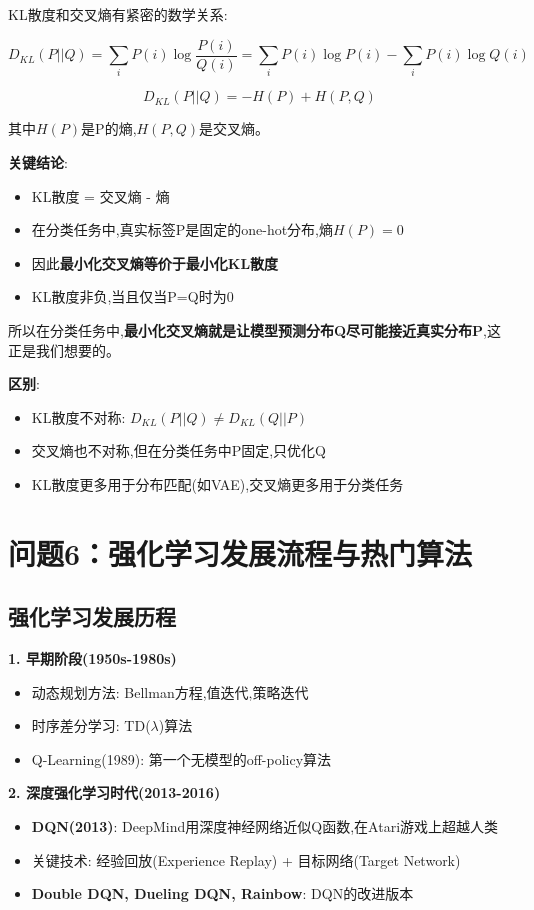 \documentclass[UTF8]{ctexart}
\begin{document}
KL散度和交叉熵有紧密的数学关系:

$$D_{KL}(P||Q) = \sum_{i}P(i)\log\frac{P(i)}{Q(i)} = \sum_{i}P(i)\log P(i) - \sum_{i}P(i)\log Q(i)$$

$$D_{KL}(P||Q) = -H(P) + H(P,Q)$$

其中$H(P)$是P的熵,$H(P,Q)$是交叉熵。

\textbf{关键结论}:
\begin{itemize}
    \item KL散度 = 交叉熵 - 熵
    \item 在分类任务中,真实标签P是固定的one-hot分布,熵$H(P)=0$
    \item 因此\textbf{最小化交叉熵等价于最小化KL散度}
    \item KL散度非负,当且仅当P=Q时为0
\end{itemize}

所以在分类任务中,\textbf{最小化交叉熵就是让模型预测分布Q尽可能接近真实分布P},这正是我们想要的。

\textbf{区别}:
\begin{itemize}
    \item KL散度不对称: $D_{KL}(P||Q) \neq D_{KL}(Q||P)$
    \item 交叉熵也不对称,但在分类任务中P固定,只优化Q
    \item KL散度更多用于分布匹配(如VAE),交叉熵更多用于分类任务
\end{itemize}

\section{问题6：强化学习发展流程与热门算法}

\subsection{强化学习发展历程}

\textbf{1. 早期阶段(1950s-1980s)}
\begin{itemize}
    \item 动态规划方法: Bellman方程,值迭代,策略迭代
    \item 时序差分学习: TD($\lambda$)算法
    \item Q-Learning(1989): 第一个无模型的off-policy算法
\end{itemize}

\textbf{2. 深度强化学习时代(2013-2016)}
\begin{itemize}
    \item \textbf{DQN(2013)}: DeepMind用深度神经网络近似Q函数,在Atari游戏上超越人类
    \item 关键技术: 经验回放(Experience Replay) + 目标网络(Target Network)
    \item \textbf{Double DQN, Dueling DQN, Rainbow}: DQN的改进版本
\end{itemize}
\end{document}
